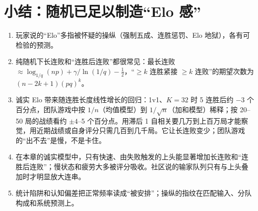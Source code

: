 \section{小结：随机已足以制造“Elo 感”}
\label{sec:ch3-summary}

\begin{keybox}[本章要点]
\begin{enumerate}
\item 玩家说的“Elo”多指被怀疑的操纵（强制五成、连胜惩罚、Elo 地狱），各有可检验的预测。
\item 纯随机下长连败和“连胜后连败”都很常见：最长连败 $\approx\log_{1/q}(np)+\gamma/\ln(1/q)-\frac12$\nobreak，“$\ge k$ 连胜紧接 $\ge k$ 连败”的期望次数为 $(n-2k+1)(pq)^k$。
\item 诚实 Elo 带来随连胜长度线性增长的回归：1v1、$K=32$ 时 5 连胜后约 $-3$ 个百分点，团队游戏中按 $1/n$（均值模型）到 $1/\sqrt n$（加和模型）稀释；按 20–50 局的战绩看约 $\pm4$–5 个百分点。用滞后 1 自相关要几万到上百万局才能察觉，用近期战绩或自身评分只需几百到几千局。它让长连败变少；团队游戏的“出不去”是慢，不是卡住。
\item 在本章的诚实模型中，只有快速、由失败触发的上头能显著增加长连败和“连胜后连败”；慢状态和疲劳大多被评分吸收。社区说的输家队列只有与上头叠加时才明显放大连串。
\item 统计陷阱和认知偏差把正常频率读成“被安排”；操纵的指纹在匹配输入、分队构成和系统预测上。
\end{enumerate}
\end{keybox}
